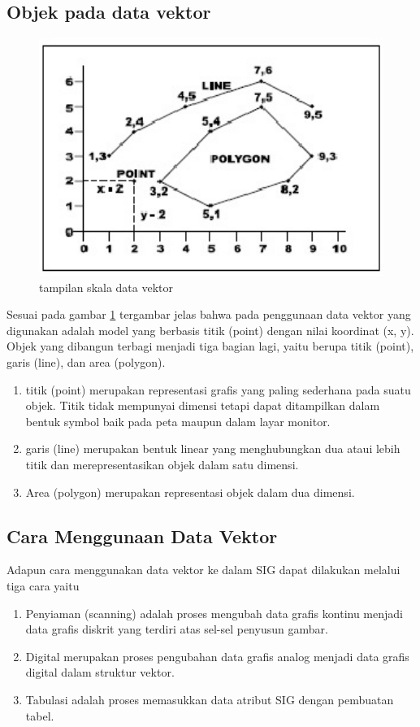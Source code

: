 \subsection {Objek pada data vektor}
\begin{figure}[ht]
\centerline{\includegraphics[width=1\textwidth] {figures/vektor02.jpg}}
\caption{tampilan skala data vektor}
\label{vektor02}
\end{figure}
Sesuai pada gambar \ref{vektor02} tergambar jelas bahwa pada penggunaan data vektor yang digunakan adalah model yang berbasis titik (point) dengan nilai koordinat (x, y).
Objek yang dibangun terbagi menjadi tiga bagian lagi, yaitu berupa titik (point), garis (line), dan area (polygon). 
\begin{enumerate}
\item titik (point) merupakan representasi grafis yang paling sederhana pada suatu objek. Titik tidak mempunyai dimensi tetapi dapat ditampilkan dalam bentuk symbol baik pada peta maupun dalam layar monitor.
\item garis (line) merupakan bentuk linear yang menghubungkan dua ataui lebih titik dan merepresentasikan objek dalam satu dimensi. 
\item Area (polygon) merupakan representasi objek dalam dua dimensi.
\end{enumerate}

\subsection {Cara Menggunaan Data Vektor}
Adapun cara menggunakan data vektor ke dalam SIG dapat dilakukan melalui tiga cara yaitu 
\begin{enumerate}
\item Penyiaman (scanning) adalah proses mengubah data grafis kontinu menjadi data grafis diskrit yang terdiri atas sel-sel penyusun gambar.
\item Digital merupakan proses pengubahan data grafis analog menjadi data grafis digital dalam struktur vektor.
\item Tabulasi adalah proses memasukkan data atribut SIG dengan pembuatan tabel.
\end{enumerate}

